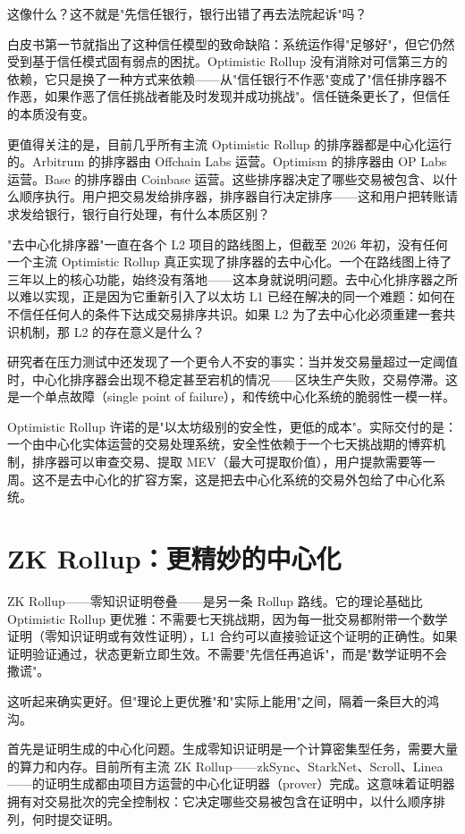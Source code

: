 \documentclass[a4paper,12pt,openany]{ctexbook}
\begin{document}
这像什么？这不就是"先信任银行，银行出错了再去法院起诉"吗？

白皮书第一节就指出了这种信任模型的致命缺陷：系统运作得"足够好"，但它仍然受到基于信任模式固有弱点的困扰。Optimistic Rollup 没有消除对可信第三方的依赖，它只是换了一种方式来依赖——从"信任银行不作恶"变成了"信任排序器不作恶，如果作恶了信任挑战者能及时发现并成功挑战"。信任链条更长了，但信任的本质没有变。

更值得关注的是，目前几乎所有主流 Optimistic Rollup 的排序器都是中心化运行的。Arbitrum 的排序器由 Offchain Labs 运营。Optimism 的排序器由 OP Labs 运营。Base 的排序器由 Coinbase 运营。这些排序器决定了哪些交易被包含、以什么顺序执行。用户把交易发给排序器，排序器自行决定排序——这和用户把转账请求发给银行，银行自行处理，有什么本质区别？

"去中心化排序器"一直在各个 L2 项目的路线图上，但截至 2026 年初，没有任何一个主流 Optimistic Rollup 真正实现了排序器的去中心化。一个在路线图上待了三年以上的核心功能，始终没有落地——这本身就说明问题。去中心化排序器之所以难以实现，正是因为它重新引入了以太坊 L1 已经在解决的同一个难题：如何在不信任任何人的条件下达成交易排序共识。如果 L2 为了去中心化必须重建一套共识机制，那 L2 的存在意义是什么？

研究者在压力测试中还发现了一个更令人不安的事实：当并发交易量超过一定阈值时，中心化排序器会出现不稳定甚至宕机的情况——区块生产失败，交易停滞。这是一个单点故障（single point of failure），和传统中心化系统的脆弱性一模一样。

Optimistic Rollup 许诺的是"以太坊级别的安全性，更低的成本"。实际交付的是：一个由中心化实体运营的交易处理系统，安全性依赖于一个七天挑战期的博弈机制，排序器可以审查交易、提取 MEV（最大可提取价值），用户提款需要等一周。这不是去中心化的扩容方案，这是把去中心化系统的交易外包给了中心化系统。


\section*{ZK Rollup：更精妙的中心化}


ZK Rollup——零知识证明卷叠——是另一条 Rollup 路线。它的理论基础比 Optimistic Rollup 更优雅：不需要七天挑战期，因为每一批交易都附带一个数学证明（零知识证明或有效性证明），L1 合约可以直接验证这个证明的正确性。如果证明验证通过，状态更新立即生效。不需要"先信任再追诉"，而是"数学证明不会撒谎"。

这听起来确实更好。但"理论上更优雅"和"实际上能用"之间，隔着一条巨大的鸿沟。

首先是证明生成的中心化问题。生成零知识证明是一个计算密集型任务，需要大量的算力和内存。目前所有主流 ZK Rollup——zkSync、StarkNet、Scroll、Linea——的证明生成都由项目方运营的中心化证明器（prover）完成。这意味着证明器拥有对交易批次的完全控制权：它决定哪些交易被包含在证明中，以什么顺序排列，何时提交证明。
\end{document}
